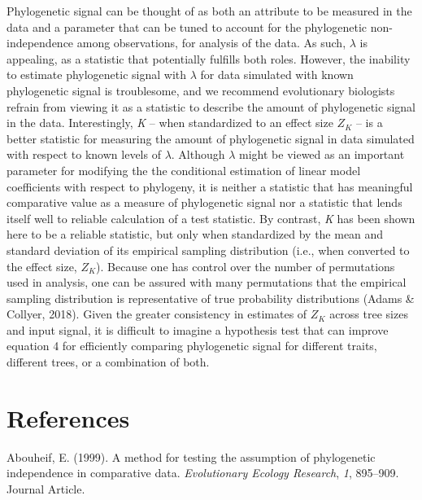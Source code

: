 \documentclass[
]{article}
\begin{document}
Phylogenetic signal can be thought of as both an attribute to be
measured in the data and a parameter that can be tuned to account for
the phylogenetic non-independence among observations, for analysis of
the data. As such, \(\lambda\) is appealing, as a statistic that
potentially fulfills both roles. However, the inability to estimate
phylogenetic signal with \(\lambda\) for data simulated with known
phylogenetic signal is troublesome, and we recommend evolutionary
biologists refrain from viewing it as a statistic to describe the amount
of phylogenetic signal in the data. Interestingly, \emph{K} -- when
standardized to an effect size \(Z_K\) -- is a better statistic for
measuring the amount of phylogenetic signal in data simulated with
respect to known levels of \(\lambda\). Although \(\lambda\) might be
viewed as an important parameter for modifying the the conditional
estimation of linear model coefficients with respect to phylogeny, it is
neither a statistic that has meaningful comparative value as a measure
of phylogenetic signal nor a statistic that lends itself well to
reliable calculation of a test statistic. By contrast, \emph{K} has been
shown here to be a reliable statistic, but only when standardized by the
mean and standard deviation of its empirical sampling distribution
(i.e., when converted to the effect size, \(Z_K\)). Because one has
control over the number of permutations used in analysis, one can be
assured with many permutations that the empirical sampling distribution
is representative of true probability distributions (Adams \& Collyer,
2018). Given the greater consistency in estimates of \(Z_K\) across tree
sizes and input signal, it is difficult to imagine a hypothesis test
that can improve equation 4 for efficiently comparing phylogenetic
signal for different traits, different trees, or a combination of both.

\newpage

\hypertarget{references}{%
\section*{References}\label{references}}

\setlength{\parindent}{-0.25in} \setlength{\leftskip}{0.25in}
\setlength{\parskip}{8pt} \noindent

\hypertarget{refs}{}
\leavevmode\hypertarget{ref-Abouheif1999}{}%
Abouheif, E. (1999). A method for testing the assumption of phylogenetic
independence in comparative data. \emph{Evolutionary Ecology Research},
\emph{1}, 895--909. Journal Article.
\end{document}
